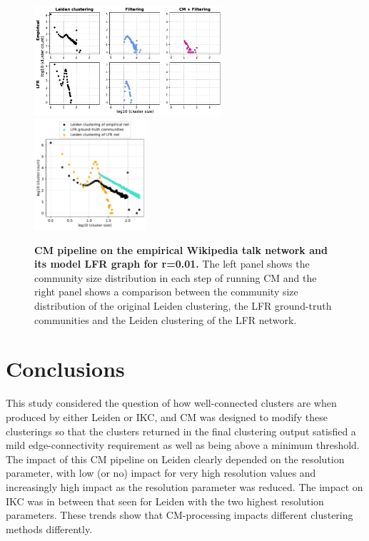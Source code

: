 \documentclass[11pt]{article}   	%
\begin{document}
\begin{figure}[h!]
\centering
\includegraphics[width=0.62\textwidth]{figs/wiki_talk_cm_steps_lfr01.pdf}
\includegraphics[width=0.37\textwidth]{figs/wiki_talk_01_cm_size.pdf}
\caption[CM pipeline on the Wikipedia talk network and its model LFR graph for r=0.01]{\textbf{CM pipeline on the empirical Wikipedia talk network and its model LFR graph for r=0.01.} The left panel shows the community size distribution in each step of running CM and the right panel shows a comparison between the community size distribution of the original Leiden clustering, the LFR ground-truth communities and the Leiden clustering of the LFR network.}
\label{fig:wikitalk-cm-lfr-01}
\end{figure}

\section{Conclusions} 
This study considered the question of how well-connected clusters are when produced by either Leiden or IKC, and CM was designed to modify these clusterings so that  the clusters returned in the final clustering output satisfied a mild edge-connectivity requirement as well as  being above a minimum threshold.
The impact of this CM pipeline  on Leiden clearly depended on the resolution parameter, with low (or no) impact for very high resolution values and increasingly high impact as the resolution parameter was reduced.  The impact on IKC was in between that seen for Leiden with the two highest resolution parameters.
These trends show that CM-processing impacts different clustering methods differently.
\end{document}
